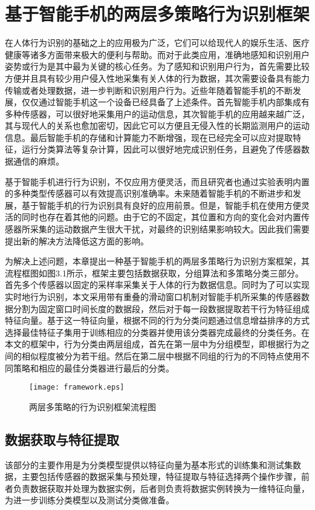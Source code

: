 \chapter{基于智能手机的两层多策略行为识别框架}

\par 在人体行为识别的基础之上的应用极为广泛，它们可以给现代人的娱乐生活、医疗健康等诸多方面带来极大的便利与帮助。而对于此类应用，准确地感知和识别用户姿势或行为是其中最为关键的核心任务。为了感知和识别用户行为，首先需要比较方便并且具有较少用户侵入性地采集有关人体的行为数据，其次需要设备具有能力传输或者处理数据，进一步判断和识别用户行为。近些年随着智能手机的不断发展，仅仅通过智能手机这一个设备已经具备了上述条件。首先智能手机内部集成有多种传感器，可以很好地采集用户的运动信息，其次智能手机的应用越来越广泛，其与现代人的关系也愈加密切，因此它可以方便且无侵入性的长期监测用户的运动信息。最后智能手机的存储和计算能力不断增强，现在已经完全可以应对提取特征，运行分类算法等复杂计算，因此可以很好地完成识别任务，且避免了传感器数据通信的麻烦。
\par 基于智能手机进行行为识别，不仅应用方便灵活，而且研究者也通过实验表明内置的多种类型传感器可以有效提高识别准确率。未来随着智能手机的不断进步和发展，基于智能手机的行为识别具有良好的应用前景。但是，智能手机在使用方便灵活的同时也存在着其他的问题。由于它的不固定，其位置和方向的变化会对内置传感器所采集的运动数据产生很大干扰，对最终的识别结果影响较大。因此我们需要提出新的解决方法降低这方面的影响。
\par 为解决上述问题，本章提出一种基于智能手机的两层多策略行为识别方案框架，其流程框图如图3.1所示，框架主要包括数据获取，分组算法和多策略分类三部分。首先多个传感器以固定的采样率采集关于人体的行为数据信息。同时为了可以实现实时地行为识别，本文采用带有重叠的滑动窗口机制对智能手机所采集的传感器数据分割为固定窗口时间长度的数据段，然后对于每一段数据提取若干行为特征组成特征向量。基于这一特征向量，根据不同的行为分类问题通过信息增益排序的方式选择最佳特征子集用于训练相应的分类器并使用该分类器完成最终的分类任务。在本文的框架中，行为分类由两层组成，首先在第一层中为分组模型，即根据行为之间的相似程度被分为若干组。然后在第二层中根据不同组的行为的不同特点使用不同策略和相应的最佳分类器进行最后的分类。
\begin{figure}[ht]
\centering
\texttt{[image: framework.eps]}
\caption{两层多策略的行为识别框架流程图}
\end{figure}

\section{数据获取与特征提取}
\par 该部分的主要作用是为分类模型提供以特征向量为基本形式的训练集和测试集数据，主要包括传感器的数据采集与预处理，特征提取与特征选择两个操作步骤，前者负责数据获取并处理为数据实例，后者则负责将数据实例转换为一维特征向量，为进一步训练分类模型以及测试分类做准备。
